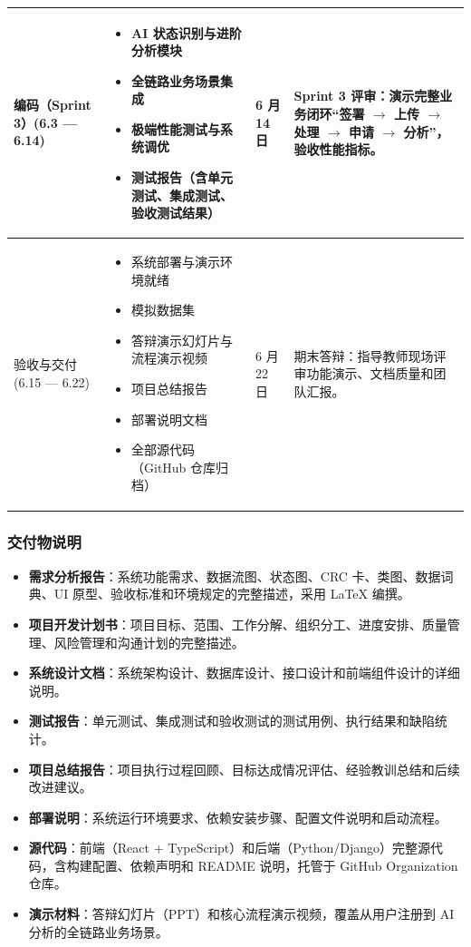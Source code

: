 \begin{longtable}{|p{24mm}|p{56mm}|p{28mm}|p{28mm}|}
\hline

编码（Sprint 3）\newline(6.3 — 6.14) &
\begin{itemize}
  \item AI 状态识别与进阶分析模块
  \item 全链路业务场景集成
  \item 极端性能测试与系统调优
  \item 测试报告（含单元测试、集成测试、验收测试结果）
\end{itemize} &
6 月 14 日 &
Sprint 3 评审：演示完整业务闭环“签署 $\to$ 上传 $\to$ 处理 $\to$ 申请 $\to$ 分析”，验收性能指标。 \\

\hline

验收与交付 \newline(6.15 — 6.22) &
\begin{itemize}
  \item 系统部署与演示环境就绪
  \item 模拟数据集
  \item 答辩演示幻灯片与流程演示视频
  \item 项目总结报告
  \item 部署说明文档
  \item 全部源代码（GitHub 仓库归档）
\end{itemize} &
6 月 22 日 &
期末答辩：指导教师现场评审功能演示、文档质量和团队汇报。 \\

\hline
\end{longtable}

\subsubsection{交付物说明}

\begin{itemize}
  \item \textbf{需求分析报告}：系统功能需求、数据流图、状态图、CRC 卡、类图、数据词典、UI 原型、验收标准和环境规定的完整描述，采用 LaTeX 编撰。
  \item \textbf{项目开发计划书}：项目目标、范围、工作分解、组织分工、进度安排、质量管理、风险管理和沟通计划的完整描述。
  \item \textbf{系统设计文档}：系统架构设计、数据库设计、接口设计和前端组件设计的详细说明。
  \item \textbf{测试报告}：单元测试、集成测试和验收测试的测试用例、执行结果和缺陷统计。
  \item \textbf{项目总结报告}：项目执行过程回顾、目标达成情况评估、经验教训总结和后续改进建议。
  \item \textbf{部署说明}：系统运行环境要求、依赖安装步骤、配置文件说明和启动流程。
  \item \textbf{源代码}：前端（React + TypeScript）和后端（Python/Django）完整源代码，含构建配置、依赖声明和 README 说明，托管于 GitHub Organization 仓库。
  \item \textbf{演示材料}：答辩幻灯片（PPT）和核心流程演示视频，覆盖从用户注册到 AI 分析的全链路业务场景。
\end{itemize}
